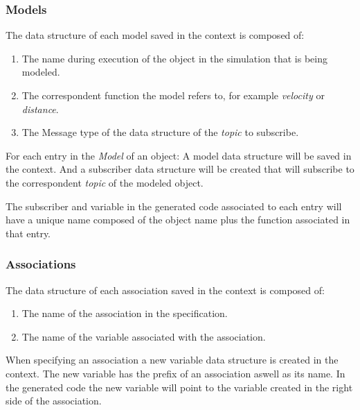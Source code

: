 \subsubsection{Models}
\label{sssec:compileModels}

The data structure of each model saved in the context is composed of:

\begin{enumerate}
    \item The name during execution of the object in the simulation that is being modeled.
    \item The correspondent function the model refers to, for example \textit{velocity} or \textit{distance}.
    \item The Message type of the data structure of the \textit{topic} to subscribe.
\end{enumerate}

For each entry in the \textit{Model} of an object: A model data structure will be saved in the context. And a subscriber data structure will be created that will subscribe to the correspondent \textit{topic} of the modeled object.

The subscriber and variable in the generated code associated to each entry will have a unique name composed of the object name plus the function associated in that entry.


\subsubsection{Associations}
\label{sssec:compileAssoc}

The data structure of each association saved in the context is composed of:

\begin{enumerate}
    \item The name of the association in the specification.
    \item The name of the variable associated with the association.
\end{enumerate}

When specifying an association a new variable data structure is created in the context. The new variable has the prefix of an association aswell as its name. In the generated code the new variable will point to the variable created in the right side of the association.


